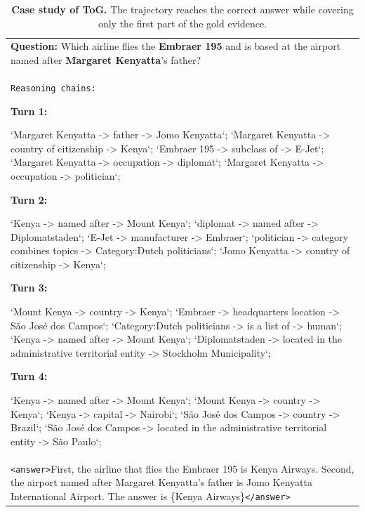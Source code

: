 \begin{table}[ht]
\centering
\footnotesize
\setlength{\tabcolsep}{8pt}
\renewcommand{\arraystretch}{1.3}
\caption{\textbf{Case study of ToG.} The trajectory reaches the correct answer while covering only the first part of the gold evidence.}

\begin{tabular}{>{\raggedright\arraybackslash}p{}}
\rowcolor{gray!20}
\textbf{Question:} Which airline flies the \textbf{Embraer 195} and is based at the airport named after \textbf{Margaret Kenyatta}'s father? \\[4pt]

\rowcolor{blue!10}
\texttt{Reasoning chains:}

\textbf{Turn 1:}

  `Margaret Kenyatta -> father -> Jomo Kenyatta`;
  `Margaret Kenyatta -> country of citizenship -> Kenya`;
  `Embraer 195 -> subclass of -> E-Jet`;
  `Margaret Kenyatta -> occupation -> diplomat`;
  `Margaret Kenyatta -> occupation -> politician`;
  
\textbf{Turn 2:}

 `Kenya -> named after -> Mount Kenya`;
 `diplomat -> named after -> Diplomatstaden`;
 `E-Jet -> manufacturer -> Embraer`;
 `politician -> category combines topics -> Category:Dutch politicians`;
 `Jomo Kenyatta -> country of citizenship -> Kenya`;
 
\textbf{Turn 3:}

 `Mount Kenya -> country -> Kenya`;
 `Embraer -> headquarters location -> São José dos Campos`;
 `Category:Dutch politicians -> is a list of -> human`;
 `Kenya -> named after -> Mount Kenya`;
 `Diplomatstaden -> located in the administrative territorial entity -> Stockholm Municipality`;
 
\textbf{Turn 4:}

 `Kenya -> named after -> Mount Kenya`;
 `Mount Kenya -> country -> Kenya`;
 `Kenya -> capital -> Nairobi`;
 `São José dos Campos -> country -> Brazil`;
 `São José dos Campos -> located in the administrative territorial entity -> São Paulo`; \\

\rowcolor{red!30}
\texttt{<answer>}First, the airline that flies the Embraer 195 is Kenya Airways. Second, the airport named after Margaret Kenyatta's father is Jomo Kenyatta International Airport. The answer is \{Kenya Airways\}\texttt{</answer>}\\
\end{tabular}

\label{tab:togcase}
\end{table}